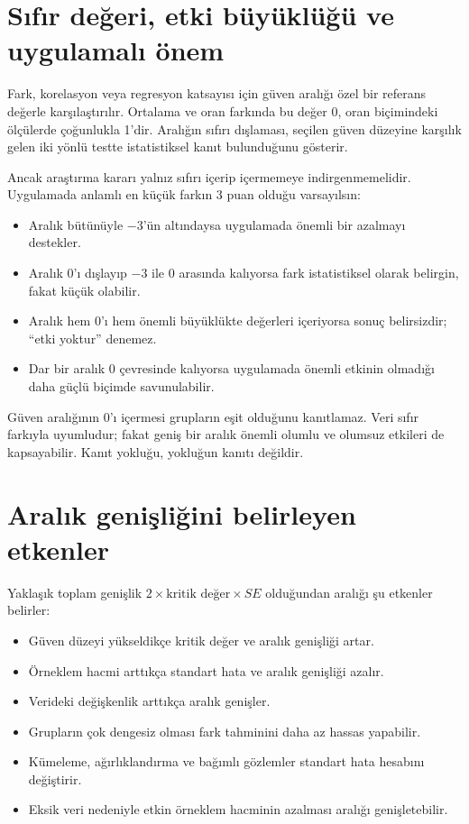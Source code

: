 \section{Sıfır değeri, etki büyüklüğü ve uygulamalı önem}

Fark, korelasyon veya regresyon katsayısı için güven aralığı özel bir
referans değerle karşılaştırılır. Ortalama ve oran farkında bu değer 0, oran
biçimindeki ölçülerde çoğunlukla 1'dir. Aralığın sıfırı dışlaması, seçilen
güven düzeyine karşılık gelen iki yönlü testte istatistiksel kanıt bulunduğunu
gösterir.

Ancak araştırma kararı yalnız sıfırı içerip içermemeye indirgenmemelidir.
Uygulamada anlamlı en küçük farkın 3 puan olduğu varsayılsın:

\begin{itemize}
  \item Aralık bütünüyle $-3$'ün altındaysa uygulamada önemli bir azalmayı destekler.
  \item Aralık 0'ı dışlayıp $-3$ ile 0 arasında kalıyorsa fark istatistiksel olarak belirgin, fakat küçük olabilir.
  \item Aralık hem 0'ı hem önemli büyüklükte değerleri içeriyorsa sonuç belirsizdir; ``etki yoktur'' denemez.
  \item Dar bir aralık 0 çevresinde kalıyorsa uygulamada önemli etkinin olmadığı daha güçlü biçimde savunulabilir.
\end{itemize}

\begin{mistakebox}
Güven aralığının 0'ı içermesi grupların eşit olduğunu kanıtlamaz. Veri sıfır
farkıyla uyumludur; fakat geniş bir aralık önemli olumlu ve olumsuz etkileri
de kapsayabilir. Kanıt yokluğu, yokluğun kanıtı değildir.
\end{mistakebox}

\section{Aralık genişliğini belirleyen etkenler}

Yaklaşık toplam genişlik $2\times\text{kritik değer}\times SE$ olduğundan
aralığı şu etkenler belirler:

\begin{itemize}
  \item Güven düzeyi yükseldikçe kritik değer ve aralık genişliği artar.
  \item Örneklem hacmi arttıkça standart hata ve aralık genişliği azalır.
  \item Verideki değişkenlik arttıkça aralık genişler.
  \item Grupların çok dengesiz olması fark tahminini daha az hassas yapabilir.
  \item Kümeleme, ağırlıklandırma ve bağımlı gözlemler standart hata hesabını değiştirir.
  \item Eksik veri nedeniyle etkin örneklem hacminin azalması aralığı genişletebilir.
\end{itemize}

